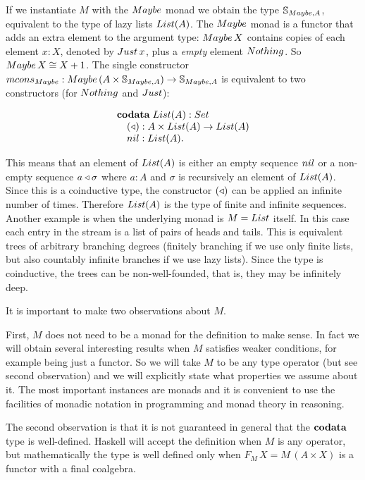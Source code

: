 If we instantiate $M$ with the $\maybe$ monad we obtain the type $\stream{\maybe,A}$, equivalent to the type of lazy lists $\lst{A}$.
The $\maybe$ monad is a functor that adds an extra element to the argument type:
$\maybe\,X$ contains copies of each element $x:X$, denoted by $\just\,x$, plus a {\em empty} element $\nothing$.
So $\maybe\,X \cong X+1$.
The single constructor $\mcons_\maybe: \maybe\,(A\times \stream{\maybe,A})\rightarrow\stream{\maybe,A}$ is equivalent to two constructors (for $\nothing$ and $\just$):

$$
\begin{array}[t]{l}
\codata\;
\lst{A}:\set\\
\quad (\scons): A\times \lst{A}\rightarrow\lst{A}\\
\quad \nil: \lst{A}.
\end{array}
$$

This means that an element of $\lst{A}$ is either an empty sequence $\nil$ or a non-empty sequence $a\triangleleft \sigma$ where $a:A$ and $\sigma$ is recursively an element of $\lst{A}$.
Since this is a coinductive type, the constructor $(\triangleleft)$ can be applied an infinite number of times.
Therefore $\lst{A}$ is the type of finite and infinite sequences. \\

Another example is when the underlying monad is $M = \lstsym $ itself.
In this case each entry in the stream is a list of pairs of heads and tails.
This is equivalent trees of arbitrary branching degrees (finitely branching if we use only finite lists, but also countably infinite branches if we use lazy lists).
Since the type is coinductive, the trees can be non-well-founded, that is, they may be infinitely deep.


It is important to make two observations about $M$.

First, $M$ does not need to be a monad for the definition to make sense. 
In fact we will obtain several interesting results when $M$ satisfies weaker conditions, for example being just a functor.
So we will take $M$ to be any type operator (but see second observation) and we will explicitly state what properties we assume about it.
The most important instances are monads and it is convenient to use the facilities of monadic notation in programming and monad theory in reasoning.

The second observation is that it is not guaranteed in general that the $\mathbf{codata}$ type is well-defined.
Haskell will accept the definition when $M$ is any operator, but mathematically the type is well defined only when $F_M\,X = M\,(A\times X)$ is a functor with a final coalgebra.


